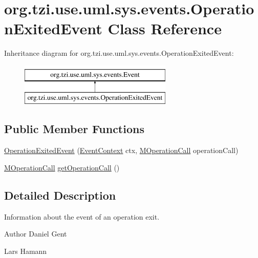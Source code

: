 \hypertarget{classorg_1_1tzi_1_1use_1_1uml_1_1sys_1_1events_1_1_operation_exited_event}{\section{org.\-tzi.\-use.\-uml.\-sys.\-events.\-Operation\-Exited\-Event Class Reference}
\label{classorg_1_1tzi_1_1use_1_1uml_1_1sys_1_1events_1_1_operation_exited_event}
}
Inheritance diagram for org.\-tzi.\-use.\-uml.\-sys.\-events.\-Operation\-Exited\-Event\-:\begin{figure}[H]
\begin{center}
\leavevmode
\includegraphics[height=2.000000cm]{classorg_1_1tzi_1_1use_1_1uml_1_1sys_1_1events_1_1_operation_exited_event}
\end{center}
\end{figure}
\subsection*{Public Member Functions}
\begin{DoxyCompactItemize}
\item 
\hyperlink{classorg_1_1tzi_1_1use_1_1uml_1_1sys_1_1events_1_1_operation_exited_event_a0ea5ad75e01569f5c2d079e7c4f458d9}{Operation\-Exited\-Event} (\hyperlink{enumorg_1_1tzi_1_1use_1_1uml_1_1sys_1_1events_1_1tags_1_1_event_context}{Event\-Context} ctx, \hyperlink{classorg_1_1tzi_1_1use_1_1uml_1_1sys_1_1_m_operation_call}{M\-Operation\-Call} operation\-Call)
\item 
\hyperlink{classorg_1_1tzi_1_1use_1_1uml_1_1sys_1_1_m_operation_call}{M\-Operation\-Call} \hyperlink{classorg_1_1tzi_1_1use_1_1uml_1_1sys_1_1events_1_1_operation_exited_event_aca10b4c85b4f6c6e379f6e2f36412c64}{get\-Operation\-Call} ()
\end{DoxyCompactItemize}


\subsection{Detailed Description}
Information about the event of an operation exit. \begin{DoxyAuthor}{Author}
Daniel Gent 

Lars Hamann 
\end{DoxyAuthor}


